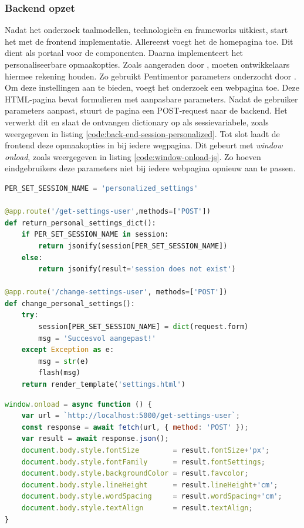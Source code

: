 \subsubsection{Backend opzet}

Nadat het onderzoek taalmodellen, technologieën en frameworks uitkiest, start het met de frontend implementatie. Allereerst voegt het de homepagina toe. Dit dient als portaal voor de componenten. Daarna implementeert het personaliseerbare opmaakopties. Zoals aangeraden door \textcite{Galliussi2020}, moeten ontwikkelaars hiermee rekening houden. Zo gebruikt Pentimentor parameters onderzocht door \textcite{Rello2013a, Rello2013b}. Om deze instellingen aan te bieden, voegt het onderzoek een webpagina toe. Deze HTML-pagina bevat formulieren met aanpasbare parameters. Nadat de gebruiker parameters aanpast, stuurt de pagina een POST-request naar de backend. Het verwerkt dit en slaat de ontvangen dictionary op als sessievariabele, zoals weergegeven in listing \ref{code:back-end-session-personalized}. Tot slot laadt de frontend deze opmaakopties in bij iedere wegpagina. Dit gebeurt met \textit{window onload}, zoals weergegeven in listing \ref{code:window-onload-js}. Zo hoeven eindgebruikers deze parameters niet bij iedere webpagina opnieuw aan te passen.


\begin{lstlisting}[language=python, caption={De backend functie die de aanpassingen uit het formulier opslaat als sessievariabele.}, label={code:back-end-session-personalized}]
PER_SET_SESSION_NAME = 'personalized_settings'

@app.route('/get-settings-user',methods=['POST'])
def return_personal_settings_dict():
	if PER_SET_SESSION_NAME in session:
		return jsonify(session[PER_SET_SESSION_NAME])
	else:
		return jsonify(result='session does not exist')
	
@app.route('/change-settings-user', methods=['POST'])
def change_personal_settings():
	try:
		session[PER_SET_SESSION_NAME] = dict(request.form)
		msg = 'Succesvol aangepast!'
	except Exception as e:
		msg = str(e)
		flash(msg)
	return render_template('settings.html')
\end{lstlisting}

\begin{lstlisting}[language=javascript, caption={De onload-functie die de gepersonaliseerde opmaakopties regelt bij het inladen van een webpagina.}, label={code:window-onload-js}]
window.onload = async function () {
	var url = `http://localhost:5000/get-settings-user`;
	const response = await fetch(url, { method: 'POST' });
	var result = await response.json();
	document.body.style.fontSize        = result.fontSize+'px';
	document.body.style.fontFamily      = result.fontSettings;
	document.body.style.backgroundColor = result.favcolor;
	document.body.style.lineHeight      = result.lineHeight+'cm';
	document.body.style.wordSpacing     = result.wordSpacing+'cm';
	document.body.style.textAlign       = result.textAlign;
}
\end{lstlisting}

